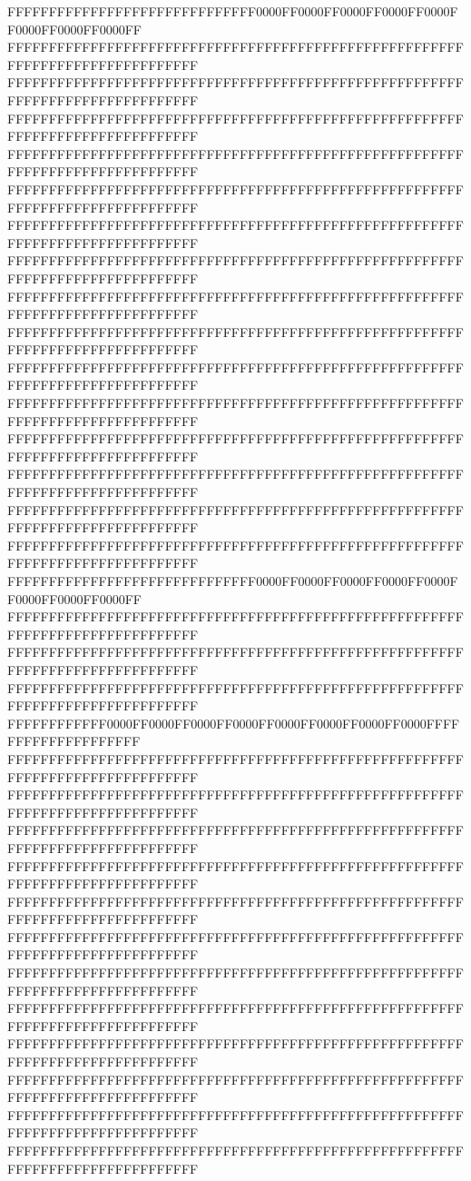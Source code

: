 FFFFFFFFFFFFFFFFFFFFFFFFFFFFFF0000FF0000FF0000FF0000FF0000FF0000FF0000FF0000FF
FFFFFFFFFFFFFFFFFFFFFFFFFFFFFFFFFFFFFFFFFFFFFFFFFFFFFFFFFFFFFFFFFFFFFFFFFFFFFF
FFFFFFFFFFFFFFFFFFFFFFFFFFFFFFFFFFFFFFFFFFFFFFFFFFFFFFFFFFFFFFFFFFFFFFFFFFFFFF
FFFFFFFFFFFFFFFFFFFFFFFFFFFFFFFFFFFFFFFFFFFFFFFFFFFFFFFFFFFFFFFFFFFFFFFFFFFFFF
FFFFFFFFFFFFFFFFFFFFFFFFFFFFFFFFFFFFFFFFFFFFFFFFFFFFFFFFFFFFFFFFFFFFFFFFFFFFFF
FFFFFFFFFFFFFFFFFFFFFFFFFFFFFFFFFFFFFFFFFFFFFFFFFFFFFFFFFFFFFFFFFFFFFFFFFFFFFF
FFFFFFFFFFFFFFFFFFFFFFFFFFFFFFFFFFFFFFFFFFFFFFFFFFFFFFFFFFFFFFFFFFFFFFFFFFFFFF
FFFFFFFFFFFFFFFFFFFFFFFFFFFFFFFFFFFFFFFFFFFFFFFFFFFFFFFFFFFFFFFFFFFFFFFFFFFFFF
FFFFFFFFFFFFFFFFFFFFFFFFFFFFFFFFFFFFFFFFFFFFFFFFFFFFFFFFFFFFFFFFFFFFFFFFFFFFFF
FFFFFFFFFFFFFFFFFFFFFFFFFFFFFFFFFFFFFFFFFFFFFFFFFFFFFFFFFFFFFFFFFFFFFFFFFFFFFF
FFFFFFFFFFFFFFFFFFFFFFFFFFFFFFFFFFFFFFFFFFFFFFFFFFFFFFFFFFFFFFFFFFFFFFFFFFFFFF
FFFFFFFFFFFFFFFFFFFFFFFFFFFFFFFFFFFFFFFFFFFFFFFFFFFFFFFFFFFFFFFFFFFFFFFFFFFFFF
FFFFFFFFFFFFFFFFFFFFFFFFFFFFFFFFFFFFFFFFFFFFFFFFFFFFFFFFFFFFFFFFFFFFFFFFFFFFFF
FFFFFFFFFFFFFFFFFFFFFFFFFFFFFFFFFFFFFFFFFFFFFFFFFFFFFFFFFFFFFFFFFFFFFFFFFFFFFF
FFFFFFFFFFFFFFFFFFFFFFFFFFFFFFFFFFFFFFFFFFFFFFFFFFFFFFFFFFFFFFFFFFFFFFFFFFFFFF
FFFFFFFFFFFFFFFFFFFFFFFFFFFFFFFFFFFFFFFFFFFFFFFFFFFFFFFFFFFFFFFFFFFFFFFFFFFFFF
FFFFFFFFFFFFFFFFFFFFFFFFFFFFFF0000FF0000FF0000FF0000FF0000FF0000FF0000FF0000FF
FFFFFFFFFFFFFFFFFFFFFFFFFFFFFFFFFFFFFFFFFFFFFFFFFFFFFFFFFFFFFFFFFFFFFFFFFFFFFF
FFFFFFFFFFFFFFFFFFFFFFFFFFFFFFFFFFFFFFFFFFFFFFFFFFFFFFFFFFFFFFFFFFFFFFFFFFFFFF
FFFFFFFFFFFFFFFFFFFFFFFFFFFFFFFFFFFFFFFFFFFFFFFFFFFFFFFFFFFFFFFFFFFFFFFFFFFFFF
FFFFFFFFFFFF0000FF0000FF0000FF0000FF0000FF0000FF0000FF0000FFFFFFFFFFFFFFFFFFFF
FFFFFFFFFFFFFFFFFFFFFFFFFFFFFFFFFFFFFFFFFFFFFFFFFFFFFFFFFFFFFFFFFFFFFFFFFFFFFF
FFFFFFFFFFFFFFFFFFFFFFFFFFFFFFFFFFFFFFFFFFFFFFFFFFFFFFFFFFFFFFFFFFFFFFFFFFFFFF
FFFFFFFFFFFFFFFFFFFFFFFFFFFFFFFFFFFFFFFFFFFFFFFFFFFFFFFFFFFFFFFFFFFFFFFFFFFFFF
FFFFFFFFFFFFFFFFFFFFFFFFFFFFFFFFFFFFFFFFFFFFFFFFFFFFFFFFFFFFFFFFFFFFFFFFFFFFFF
FFFFFFFFFFFFFFFFFFFFFFFFFFFFFFFFFFFFFFFFFFFFFFFFFFFFFFFFFFFFFFFFFFFFFFFFFFFFFF
FFFFFFFFFFFFFFFFFFFFFFFFFFFFFFFFFFFFFFFFFFFFFFFFFFFFFFFFFFFFFFFFFFFFFFFFFFFFFF
FFFFFFFFFFFFFFFFFFFFFFFFFFFFFFFFFFFFFFFFFFFFFFFFFFFFFFFFFFFFFFFFFFFFFFFFFFFFFF
FFFFFFFFFFFFFFFFFFFFFFFFFFFFFFFFFFFFFFFFFFFFFFFFFFFFFFFFFFFFFFFFFFFFFFFFFFFFFF
FFFFFFFFFFFFFFFFFFFFFFFFFFFFFFFFFFFFFFFFFFFFFFFFFFFFFFFFFFFFFFFFFFFFFFFFFFFFFF
FFFFFFFFFFFFFFFFFFFFFFFFFFFFFFFFFFFFFFFFFFFFFFFFFFFFFFFFFFFFFFFFFFFFFFFFFFFFFF
FFFFFFFFFFFFFFFFFFFFFFFFFFFFFFFFFFFFFFFFFFFFFFFFFFFFFFFFFFFFFFFFFFFFFFFFFFFFFF
FFFFFFFFFFFFFFFFFFFFFFFFFFFFFFFFFFFFFFFFFFFFFFFFFFFFFFFFFFFFFFFFFFFFFFFFFFFFFF
